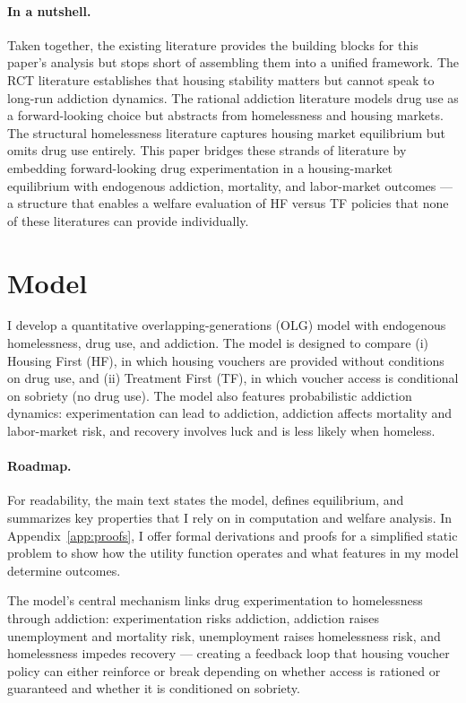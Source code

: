 \documentclass[parskip=full]{article}
\theoremstyle{plain}
\theoremstyle{definition}
\theoremstyle{remark}
\begin{document}
\paragraph{In a nutshell.}
Taken together, the existing literature provides the building blocks for this paper's analysis but stops short of assembling them into a unified framework. The RCT literature establishes that housing stability matters but cannot speak to long-run addiction dynamics. The rational addiction literature models drug use as a forward-looking choice but abstracts from homelessness and housing markets. The structural homelessness literature captures housing market equilibrium but omits drug use entirely. This paper bridges these strands of literature by embedding forward-looking drug experimentation in a housing-market equilibrium with endogenous addiction, mortality, and labor-market outcomes — a structure that enables a welfare evaluation of HF versus TF policies that none of these literatures can provide individually.

\section{Model}\label{sec:model}

I develop a quantitative overlapping-generations (OLG) model with endogenous homelessness, drug use, and addiction. The model is designed to compare (i) Housing First (HF), in which housing vouchers are provided without conditions on drug use, and (ii) Treatment First (TF), in which voucher access is conditional on sobriety (no drug use). The model also features probabilistic addiction dynamics: experimentation can lead to addiction, addiction affects mortality and labor-market risk, and recovery involves luck and is less likely when homeless.

\paragraph{Roadmap.}
For readability, the main text states the model, defines equilibrium, and summarizes key properties that I rely on in computation and welfare analysis. In Appendix~\ref{app:proofs}, I offer formal derivations and proofs for a simplified static problem to show how the utility function operates and what features in my model determine outcomes. 

The model's central mechanism links drug experimentation to 
homelessness through addiction: experimentation risks addiction, 
addiction raises unemployment and mortality risk, unemployment 
raises homelessness risk, and homelessness impedes recovery — 
creating a feedback loop that housing voucher policy can either 
reinforce or break depending on whether access is rationed or guaranteed and whether it is conditioned on sobriety.
\end{document}

